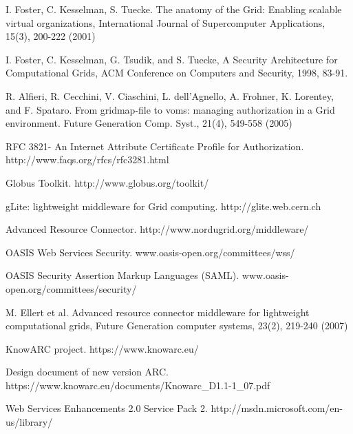 \documentclass[twocolumn]{svjour3}         %
\begin{document}
\begin{thebibliography}{}
%
%

I. Foster, C. Kesselman, S. Tuecke. The anatomy of the Grid: Enabling scalable virtual organizations, International Journal of Supercomputer Applications, 15(3), 200-222 (2001)

I. Foster, C. Kesselman, G. Tsudik, and S. Tuecke, A Security Architecture for Computational Grids, ACM Conference on Computers and Security, 1998, 83-91.

R. Alfieri, R. Cecchini, V. Ciaschini, L. dell’Agnello, A. Frohner, K. Lorentey, and F. Spataro. From gridmap-file to voms: managing authorization in a Grid environment. Future Generation Comp. Syst., 21(4), 549-558 (2005)

RFC 3821- An Internet Attribute Certificate Profile for Authorization. http://www.faqs.org/rfcs/rfc3281.html

Globus Toolkit. http://www.globus.org/toolkit/

gLite: lightweight middleware for Grid computing. http://glite.web.cern.ch

Advanced Resource Connector. http://www.nordugrid.org/middleware/

OASIS Web Services Security. www.oasis-open.org/committees/wss/

OASIS Security Assertion Markup Languages (SAML). www.oasis-open.org/committees/security/

M. Ellert et al. Advanced resource connector middleware for lightweight computational grids, Future Generation computer systems, 23(2), 219-240 (2007)

KnowARC project.  https://www.knowarc.eu/

Design document of new version ARC. https://www.knowarc.eu/documents/Knowarc\_D1.1-1\_07.pdf

Web Services Enhancements 2.0 Service Pack 2. http://msdn.microsoft.com/en-us/library/


\end{thebibliography}
\end{document}
